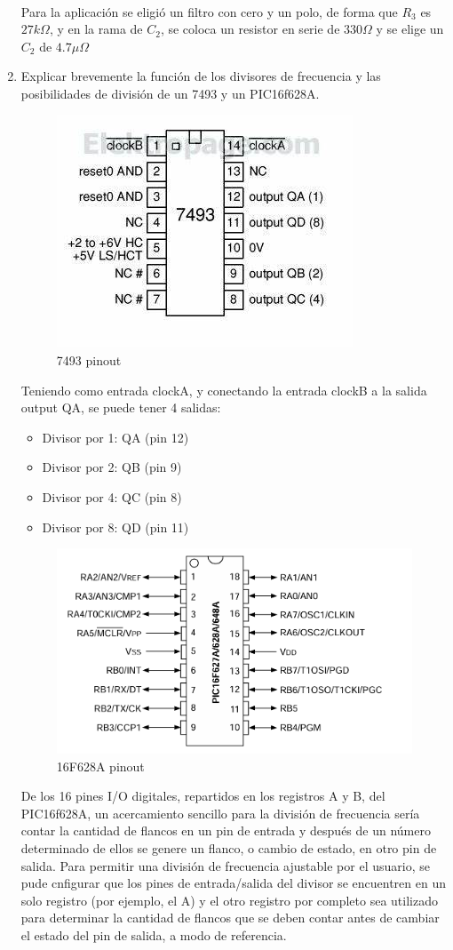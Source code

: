 \begin{enumerate}[label=\alph*)]
\begin{align}
    \end{align}
    Para la aplicación se eligió un filtro con cero y un polo, de forma que $R_3$ es $27k\Omega$, y en la rama de $C_2$, se coloca un resistor en serie de $330\Omega$ y se elige un $C_2$ de $4.7\mu\Omega$
    \item Explicar brevemente la función de los divisores de frecuencia y las posibilidades de división de un 7493 y un PIC16f628A.
    \begin{figure}[H]
        \centering
        \includegraphics[width=.5\textwidth]{imgs/3.4. 7493 pinout.jpg}
        \caption{7493 pinout}
    \end{figure}
    Teniendo como entrada clockA, y conectando la entrada clockB a la salida output QA, se puede tener 4 salidas:
    \begin{itemize}
        \item Divisor por 1: QA (pin 12)
        \item Divisor por 2: QB (pin 9)
        \item Divisor por 4: QC (pin 8)
        \item Divisor por 8: QD (pin 11)
    \end{itemize}
    \begin{figure}[H]
        \centering
        \includegraphics[width=.5\textwidth]{imgs/3.4. 16F628A pinout.png}
        \caption{16F628A pinout}
    \end{figure}
    De los 16 pines I/O digitales, repartidos en los registros A y B, del PIC16f628A, un acercamiento sencillo para la división de frecuencia sería contar la cantidad de flancos en un pin de entrada y después de un número determinado de ellos se genere un flanco, o cambio de estado, en otro pin de salida. Para permitir una división de frecuencia ajustable por el usuario, se pude cnfigurar que los pines de entrada/salida del divisor se encuentren en un solo registro  (por ejemplo, el A) y el otro registro por completo sea utilizado para determinar la cantidad de flancos que se deben contar antes de cambiar el estado del pin de salida, a modo de referencia.

\end{enumerate}
